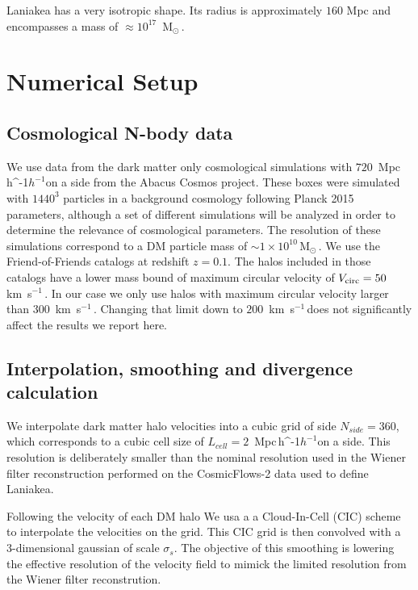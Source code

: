 \documentclass[usenatbib]{mnras}
\newcommand{\Msun}{\,{\rm M}$_{\odot}$\,}
\newcommand{\Mpch}{\,{\rm Mpc}\,\ifmmode h^{-1}\else $h^{-1}$\fi}
\newcommand{\kms}{\,{\rm km}\ s$^{-1}$\,}
\begin{document}
Laniakea has a very isotropic shape. 
Its radius is approximately $160$ Mpc and encompasses a mass of
$\approx 10^{17}$ \Msun.



\section{Numerical Setup}

\subsection{Cosmological N-body data}

We use data from the dark matter only cosmological simulations with
$720$ \Mpch on a side from the Abacus Cosmos project.  
These boxes were simulated with $1440^3$ particles in a background
cosmology following Planck 2015 parameters, although a set of
different simulations will be analyzed in order to determine the
relevance of cosmological parameters.
The resolution of these simulations correspond to a DM particle mass
of $\sim 1 \times 10^{10}$\Msun.
We use the Friend-of-Friends catalogs at redshift $z=0.1$.
The halos included in those catalogs have a lower mass bound of 
maximum circular velocity of $V_{\rm circ}=50$ \kms.
In our case we only use halos with maximum circular velocity larger
than $300$ \kms.
Changing that limit down to $200$ \kms does not significantly affect
the results we report here.

\subsection{Interpolation, smoothing and divergence calculation}  

We interpolate dark matter halo velocities into a cubic grid of side
$N_{side}=360$, which corresponds to a cubic cell size of $L_{cell}=2$
\Mpch on a side.
This resolution is deliberately smaller than the nominal resolution
used in the Wiener filter reconstruction performed on the
CosmicFlows-2 data used to define Laniakea.

Following \cite{2014Natur.513...71T} the velocity of each DM halo 
We usa a a Cloud-In-Cell (CIC) scheme to interpolate the velocities on
the grid.
This CIC grid is then convolved with a 3-dimensional gaussian of
scale $\sigma_s$. 
The objective of this smoothing is lowering the effective resolution
of the velocity field to mimick the limited resolution from the Wiener
filter reconstrution.
\end{document}
